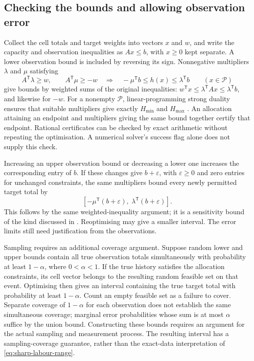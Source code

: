 \subsection{Checking the bounds and allowing observation error}

Collect the cell totals and target weights into vectors $x$ and $w$, and write the capacity and observation inequalities as $Ax\leq b$, with $x\geq0$ kept separate. A lower observation bound is included by reversing its sign. Nonnegative multipliers $\lambda$ and $\mu$ satisfying
\begin{equation}
\label{eq:bound-certificates}
 A^\mathsf{T}\lambda\geq w,\qquad
 A^\mathsf{T}\mu\geq-w
 \quad\Longrightarrow\quad
 -\mu^\mathsf{T}b\leq h(x)\leq\lambda^\mathsf{T}b
 \qquad(x\in\mathcal P)
\end{equation}
give bounds by weighted sums of the original inequalities: $w^\mathsf{T}x\leq\lambda^\mathsf{T}Ax\leq\lambda^\mathsf{T}b$, and likewise for $-w$. For a nonempty $\mathcal P$, linear-programming strong duality ensures that suitable multipliers give exactly $H_{\min}$ and $H_{\max}$ \cite[Sections~5.2--5.3]{boydvandenberghe2004}. An allocation attaining an endpoint and multipliers giving the same bound together certify that endpoint. Rational certificates can be checked by exact arithmetic without repeating the optimisation. A numerical solver's success flag alone does not supply this check.

Increasing an upper observation bound or decreasing a lower one increases the corresponding entry of $b$. If these changes give $b+\varepsilon$, with $\varepsilon\geq0$ and zero entries for unchanged constraints, the same multipliers bound every newly permitted target total by
\begin{equation}
\label{eq:relaxed-certificates}
 [-\mu^\mathsf{T}(b+\varepsilon),\;\lambda^\mathsf{T}(b+\varepsilon)].
\end{equation}
This follows by the same weighted-inequality argument; it is a sensitivity bound of the kind discussed in \cite[Section~5.6]{boydvandenberghe2004}. Reoptimising may give a smaller interval. The error limits still need justification from the observations.

Sampling requires an additional coverage argument. Suppose random lower and upper bounds contain all true observation totals simultaneously with probability at least $1-\alpha$, where $0<\alpha<1$. If the true history satisfies the allocation constraints, its cell vector belongs to the resulting random feasible set on that event. Optimising then gives an interval containing the true target total with probability at least $1-\alpha$. Count an empty feasible set as a failure to cover. Separate coverage of $1-\alpha$ for each observation does not establish the same simultaneous coverage; marginal error probabilities whose sum is at most $\alpha$ suffice by the union bound. Constructing these bounds requires an argument for the actual sampling and measurement process. The resulting interval has a sampling-coverage guarantee, rather than the exact-data interpretation of \eqref{eq:sharp-labour-range}.

